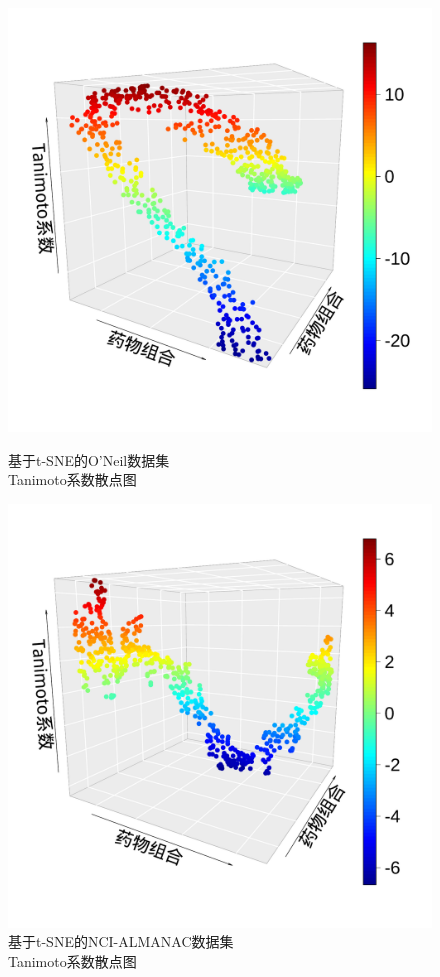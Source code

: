 \begin{figure}[H]
\centering
  \begin{minipage}{0.5\linewidth}
    \centering
    \includegraphics[width=\linewidth]{figures/o_t_sne.pdf}
    \caption{基于t-SNE的O'Neil数据集\\Tanimoto系数散点图}\label{fig:mts}
  \end{minipage}%
  \begin{minipage}{0.5\linewidth}
    \centering
    \includegraphics[width=\linewidth]{figures/n_t_sne.pdf}
    \caption{基于t-SNE的NCI-ALMANAC数据集\\Tanimoto系数散点图}\label{fig:nts}
  \end{minipage}
\end{figure}

